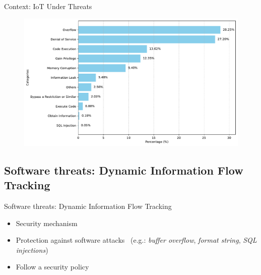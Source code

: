 \begin{frame}{Context: IoT Under Threats}
    \begin{center}
        \begin{minipage}[r]{.55\textwidth}
            \begin{figure}
                \centering
                \includegraphics[width=\textwidth]{src/1_introduction/img/threats_iot_graph.pdf}
            \end{figure}
        \end{minipage}\hspace{.5cm}%
        \begin{minipage}[c]{0.3\textwidth}
        \end{minipage}
    \end{center}
\end{frame}
\subsection{Software threats: Dynamic Information Flow Tracking}
\begin{frame}{Software threats: Dynamic Information Flow Tracking}
    \begin{block}{}
        \begin{itemize}
            [square]
            \justifying
            \item Security mechanism
            \item Protection against software attacks~\cite{HAK-21-acmcsur} (e.g.: \textit{buffer overflow}, \textit{format string}, \textit{SQL injections})
            \item Follow a security policy
        \end{itemize}
    \end{block}
\end{frame}

